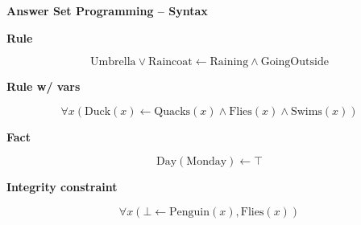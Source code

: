\documentclass[aspectratio=169]{beamer}
\newenvironment{vhcenterb}{\vspace*{\fill}\begin{center}}{\end{center}\vspace*{\fill}}
\begin{document}
\begin{frame}{\textbf{Answer Set Programming -- Syntax}}
\begin{vhcenterb}
  \begin{flushleft}
    \color{boxdgreen}\textbf{Rule}
  \end{flushleft}
  \vspace*{-0.75cm}

  \begin{equation*}
    \text{Umbrella}\vee\text{Raincoat}\gets\text{Raining}\wedge\text{GoingOutside}
  \end{equation*}

  \pause%

  \begin{flushleft}
    \color{boxdgreen}\textbf{Rule w/ vars}
  \end{flushleft}
  \vspace*{-0.75cm}

  \begin{equation*}
    \forall x(\text{Duck}(x)\gets\text{Quacks}(x)\wedge\text{Flies}(x)\wedge\text{Swims}(x))
  \end{equation*}

  \pause%

  \begin{flushleft}
    \color{boxdgreen}\textbf{Fact}
  \end{flushleft}
  \vspace*{-0.75cm}

  \begin{equation*}
    \text{Day}(\text{Monday}) \gets \top
  \end{equation*}

  \pause%

  \begin{flushleft}
    \color{boxdgreen}\textbf{Integrity constraint}
  \end{flushleft}
  \vspace*{-0.75cm}

  \begin{equation*}
    \forall x(\bot\gets\text{Penguin}(x), \text{Flies}(x))
  \end{equation*}

\end{vhcenterb}
\end{frame}
\end{document}
